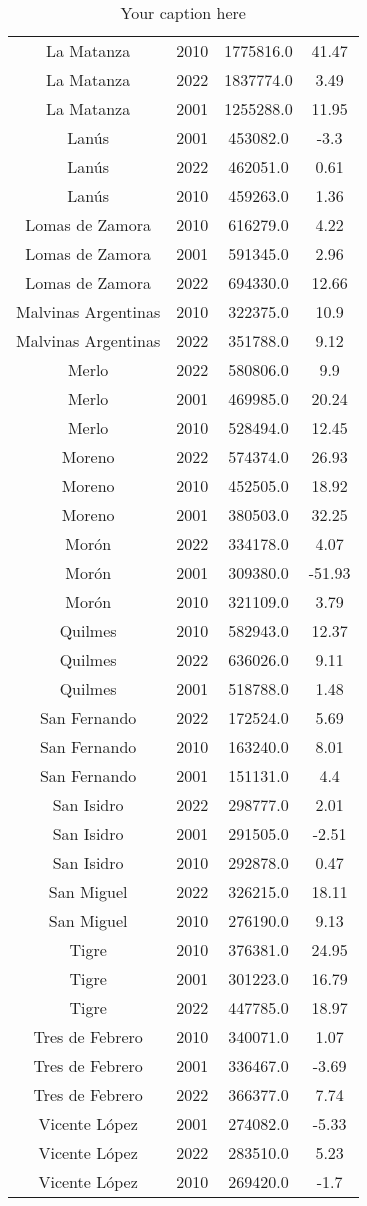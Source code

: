 \begin{table}[htb]
\begin{tabular}{|c|c|c|c|}
La Matanza & 2010 & 1775816.0 & 41.47 \\
La Matanza & 2022 & 1837774.0 & 3.49 \\
La Matanza & 2001 & 1255288.0 & 11.95 \\
Lanús & 2001 & 453082.0 & -3.3 \\
Lanús & 2022 & 462051.0 & 0.61 \\
Lanús & 2010 & 459263.0 & 1.36 \\
Lomas de Zamora & 2010 & 616279.0 & 4.22 \\
Lomas de Zamora & 2001 & 591345.0 & 2.96 \\
Lomas de Zamora & 2022 & 694330.0 & 12.66 \\
Malvinas Argentinas & 2010 & 322375.0 & 10.9 \\
Malvinas Argentinas & 2022 & 351788.0 & 9.12 \\
Merlo & 2022 & 580806.0 & 9.9 \\
Merlo & 2001 & 469985.0 & 20.24 \\
Merlo & 2010 & 528494.0 & 12.45 \\
Moreno & 2022 & 574374.0 & 26.93 \\
Moreno & 2010 & 452505.0 & 18.92 \\
Moreno & 2001 & 380503.0 & 32.25 \\
Morón & 2022 & 334178.0 & 4.07 \\
Morón & 2001 & 309380.0 & -51.93 \\
Morón & 2010 & 321109.0 & 3.79 \\
Quilmes & 2010 & 582943.0 & 12.37 \\
Quilmes & 2022 & 636026.0 & 9.11 \\
Quilmes & 2001 & 518788.0 & 1.48 \\
San Fernando & 2022 & 172524.0 & 5.69 \\
San Fernando & 2010 & 163240.0 & 8.01 \\
San Fernando & 2001 & 151131.0 & 4.4 \\
San Isidro & 2022 & 298777.0 & 2.01 \\
San Isidro & 2001 & 291505.0 & -2.51 \\
San Isidro & 2010 & 292878.0 & 0.47 \\
San Miguel & 2022 & 326215.0 & 18.11 \\
San Miguel & 2010 & 276190.0 & 9.13 \\
Tigre & 2010 & 376381.0 & 24.95 \\
Tigre & 2001 & 301223.0 & 16.79 \\
Tigre & 2022 & 447785.0 & 18.97 \\
Tres de Febrero & 2010 & 340071.0 & 1.07 \\
Tres de Febrero & 2001 & 336467.0 & -3.69 \\
Tres de Febrero & 2022 & 366377.0 & 7.74 \\
Vicente López & 2001 & 274082.0 & -5.33 \\
Vicente López & 2022 & 283510.0 & 5.23 \\
Vicente López & 2010 & 269420.0 & -1.7 \\
\hline
\end{tabular}
\caption{Your caption here}
\label{tab:my_table}
\end{table}
